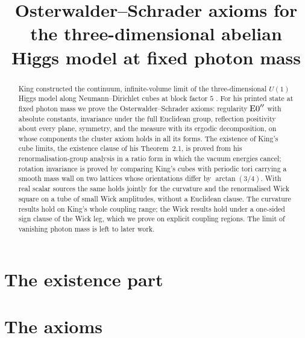 


\title[OS axioms for the 3D abelian Higgs model at fixed photon mass]{Osterwalder--Schrader axioms for the three-dimensional abelian Higgs model at fixed photon mass}
\author{}
\date{}



\begin{abstract}
King constructed the continuum, infinite-volume limit of the three-dimensional $U(1)$ Higgs model along Neumann--Dirichlet cubes at block factor $5$ \cite{K1,K2}. For his printed state at fixed photon mass we prove the Osterwalder--Schrader axioms: regularity $\mathrm{E0}''$ with absolute constants, invariance under the full Euclidean group, reflection positivity about every plane, symmetry, and the measure with its ergodic decomposition, on whose components the cluster axiom holds in all its forms. The existence of King's cube limits, the existence clause of his Theorem~2.1, is proved from his renormalisation-group analysis in a ratio form in which the vacuum energies cancel; rotation invariance is proved by comparing King's cubes with periodic tori carrying a smooth mass wall on two lattices whose orientations differ by $\arctan(3/4)$. With real scalar sources the same holds jointly for the curvature and the renormalised Wick square on a tube of small Wick amplitudes, without a Euclidean clause. The curvature results hold on King's whole coupling range; the Wick results hold under a one-sided sign clause of the Wick leg, which we prove on explicit coupling regions. The limit of vanishing photon mass is left to later work.
\end{abstract}

\maketitle






\part*{The existence part}




\part*{The axioms}









